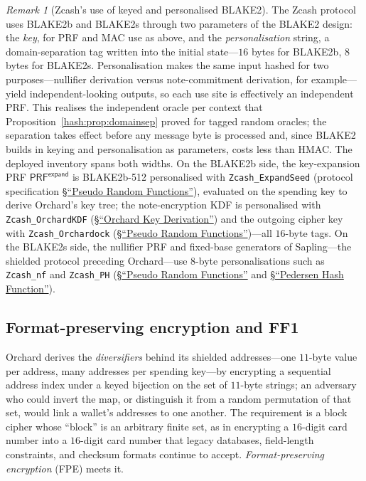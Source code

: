 \documentclass[11pt,a4paper]{article}
\theoremstyle{definition}
\theoremstyle{remark}
\newtheorem{remark}[theorem]{Remark}
\begin{document}
\begin{remark}[Zcash's use of keyed and personalised BLAKE2]
\label{prf:rem:blake2}
The Zcash protocol uses BLAKE2b and BLAKE2s through two parameters of
the BLAKE2 design: the \emph{key}, for PRF and MAC
use as above, and the \emph{personalisation} string, a
domain-separation tag written into the initial state---\(16\) bytes for
BLAKE2b, \(8\) bytes for BLAKE2s. Personalisation makes the same input
hashed for two purposes---nullifier derivation versus note-commitment
derivation, for example---yield independent-looking outputs, so each
use site is effectively an independent PRF. This realises the
independent oracle per context that
Proposition~\ref{hash:prop:domainsep} proved for tagged random
oracles; the separation takes effect before any message byte is
processed and, since BLAKE2 builds in keying and personalisation as
parameters, costs less than HMAC.
The deployed inventory spans both widths. On the BLAKE2b side, the
key-expansion PRF \(\mathsf{PRF}^{\mathsf{expand}}\) is BLAKE2b-512
personalised with
\texttt{Zcash\_\allowbreak ExpandSeed} (protocol specification
\href{https://zips.z.cash/protocol/protocol.pdf\#concreteprfs}{\S``Pseudo Random
Functions''}), evaluated on the spending key to derive Orchard's key
tree; the
note-encryption KDF is personalised with
\texttt{Zcash\_\allowbreak OrchardKDF}
(\href{https://zips.z.cash/protocol/protocol.pdf\#concreteorchardkdf}{\S``Orchard Key Derivation''})
and the outgoing
cipher key with \texttt{Zcash\_\allowbreak Orchardock}
(\href{https://zips.z.cash/protocol/protocol.pdf\#concreteprfs}{\S``Pseudo Random Functions''})---all \(16\)-byte tags. On the BLAKE2s
side, the nullifier PRF and fixed-base generators of Sapling---the
shielded protocol preceding Orchard---use \(8\)-byte personalisations
such as \texttt{Zcash\_\allowbreak nf} and
\texttt{Zcash\_\allowbreak PH}
(\href{https://zips.z.cash/protocol/protocol.pdf\#concreteprfs}{\S``Pseudo Random Functions''} and
\href{https://zips.z.cash/protocol/protocol.pdf\#concretepedersenhash}{\S``Pedersen Hash Function''}).
\end{remark}

\subsection{Format-preserving encryption and FF1}\label{prf:subsec:fpe}

Orchard derives the \emph{diversifiers} behind its shielded
addresses---one \(11\)-byte value per address, many addresses per
spending key---by encrypting a sequential address index under a keyed
bijection on the set of \(11\)-byte strings; an adversary who could
invert the map, or distinguish it from a random permutation of that
set, would link a wallet's addresses to one another. The requirement is
a block cipher whose ``block'' is an arbitrary finite set, as in
encrypting a \(16\)-digit card number into a \(16\)-digit card number
that legacy databases, field-length constraints, and checksum formats
continue to accept. \emph{Format-preserving encryption} (FPE) meets it.
\end{document}
